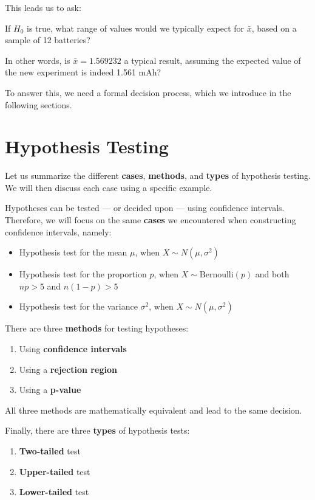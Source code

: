 \documentclass[
]{book}
\providecommand{\tightlist}{%
  \setlength{\itemsep}{0pt}\setlength{\parskip}{0pt}}
\begin{document}
This leads us to ask:

If \(H_0\) is true, what range of values would we typically expect for \(\bar{x}\), based on a sample of 12 batteries?

In other words, is \(\bar{x} = 1.569232\) a typical result, assuming the expected value of the new experiment is indeed 1.561 mAh?

To answer this, we need a formal decision process, which we introduce in the following sections.

\hypertarget{hypothesis-testing-1}{%
\section{Hypothesis Testing}\label{hypothesis-testing-1}}

Let us summarize the different \textbf{cases}, \textbf{methods}, and \textbf{types} of hypothesis testing. We will then discuss each case using a specific example.

Hypotheses can be tested --- or decided upon --- using confidence intervals. Therefore, we will focus on the same \textbf{cases} we encountered when constructing confidence intervals, namely:

\begin{itemize}
\tightlist
\item
  Hypothesis test for the mean \(\mu\), when \(X \sim N(\mu, \sigma^2)\)
\item
  Hypothesis test for the proportion \(p\), when \(X \sim \text{Bernoulli}(p)\) and both \(np > 5\) and \(n(1-p) > 5\)
\item
  Hypothesis test for the variance \(\sigma^2\), when \(X \sim N(\mu, \sigma^2)\)
\end{itemize}

There are three \textbf{methods} for testing hypotheses:

\begin{enumerate}
\def\labelenumi{\arabic{enumi}.}
\tightlist
\item
  Using \textbf{confidence intervals}
\item
  Using a \textbf{rejection region}
\item
  Using a \textbf{p-value}
\end{enumerate}

All three methods are mathematically equivalent and lead to the same decision.

Finally, there are three \textbf{types} of hypothesis tests:

\begin{enumerate}
\def\labelenumi{\arabic{enumi}.}
\tightlist
\item
  \textbf{Two-tailed} test
\item
  \textbf{Upper-tailed} test
\item
  \textbf{Lower-tailed} test
\end{enumerate}
\end{document}
